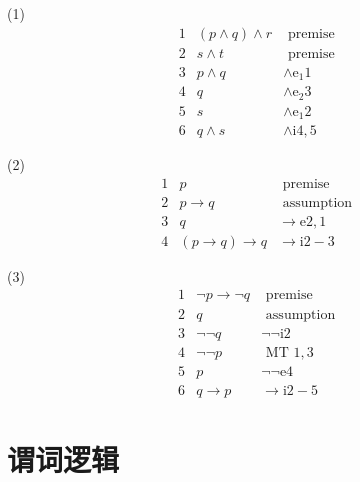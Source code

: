 \documentclass[cn, hazy, blue, normal, 12pt]{elegantnote}
\begin{document}
\begin{solution}[print=true]

    (1) $$
        \begin{array}{lll}
            1 & (p \wedge q) \wedge r & \text { premise }       \\
            2 & s \wedge t            & \text { premise }       \\
            3 & p \wedge q            & \wedge \mathrm{e}_{1} 1 \\
            4 & q                     & \wedge \mathrm{e}_{2} 3 \\
            5 & s                     & \wedge \mathrm{e}_{1} 2 \\
            6 & q \wedge s            & \wedge \mathrm{i} 4,5
        \end{array}
    $$

    (2) $$
        \begin{array}{lll}
            1 & p                               & \text { premise }          \\
            \hline
            2 & p \rightarrow q                 & \text { assumption }       \\
            3 & q                               & \rightarrow \mathrm{e} 2,1 \\
            \hline
            4 & (p \rightarrow q) \rightarrow q & \rightarrow \mathrm{i} 2-3
        \end{array}
    $$

    (3) $$
        \begin{array}{lll}
            1 & \neg p \rightarrow \neg q & \text { premise }          \\
            \hline
            2 & q                         & \text { assumption }       \\
            3 & \neg \neg q               & \neg \neg \mathrm{i} 2     \\
            4 & \neg \neg p               & \text { MT } 1,3           \\
            5 & p                         & \neg \neg \mathrm{e} 4     \\
            \hline
            6 & q \rightarrow p           & \rightarrow \mathrm{i} 2-5
        \end{array}
    $$

\end{solution}


\section{谓词逻辑}
\end{document}
